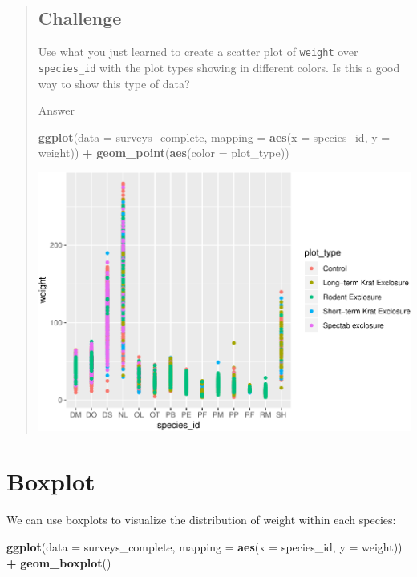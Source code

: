 \documentclass[]{book}
\newenvironment{Shaded}{\begin{snugshade}}{\end{snugshade}}
\newcommand{\KeywordTok}[1]{\textcolor[rgb]{0.13,0.29,0.53}{\textbf{#1}}}
\newcommand{\DataTypeTok}[1]{\textcolor[rgb]{0.13,0.29,0.53}{#1}}
\newcommand{\StringTok}[1]{\textcolor[rgb]{0.31,0.60,0.02}{#1}}
\newcommand{\OperatorTok}[1]{\textcolor[rgb]{0.81,0.36,0.00}{\textbf{#1}}}
\newcommand{\NormalTok}[1]{#1}
\begin{document}
\begin{quote}
\subsection{Challenge}\label{challenge-8}

Use what you just learned to create a scatter plot of \texttt{weight}
over \texttt{species\_id} with the plot types showing in different
colors. Is this a good way to show this type of data?

Answer

\begin{Shaded}
\begin{Highlighting}[]
\KeywordTok{ggplot}\NormalTok{(}\DataTypeTok{data =}\NormalTok{ surveys_complete, }\DataTypeTok{mapping =} \KeywordTok{aes}\NormalTok{(}\DataTypeTok{x =}\NormalTok{ species_id, }\DataTypeTok{y =}\NormalTok{ weight)) }\OperatorTok{+}
\StringTok{   }\KeywordTok{geom_point}\NormalTok{(}\KeywordTok{aes}\NormalTok{(}\DataTypeTok{color =}\NormalTok{ plot_type))}
\end{Highlighting}
\end{Shaded}

\includegraphics{img/R-ecology-scatter-challenge-1.pdf}
\end{quote}

\section{Boxplot}\label{boxplot}

We can use boxplots to visualize the distribution of weight within each
species:

\begin{Shaded}
\begin{Highlighting}[]
\KeywordTok{ggplot}\NormalTok{(}\DataTypeTok{data =}\NormalTok{ surveys_complete, }\DataTypeTok{mapping =} \KeywordTok{aes}\NormalTok{(}\DataTypeTok{x =}\NormalTok{ species_id, }\DataTypeTok{y =}\NormalTok{ weight)) }\OperatorTok{+}
\StringTok{    }\KeywordTok{geom_boxplot}\NormalTok{()}
\end{Highlighting}
\end{Shaded}
\end{document}
